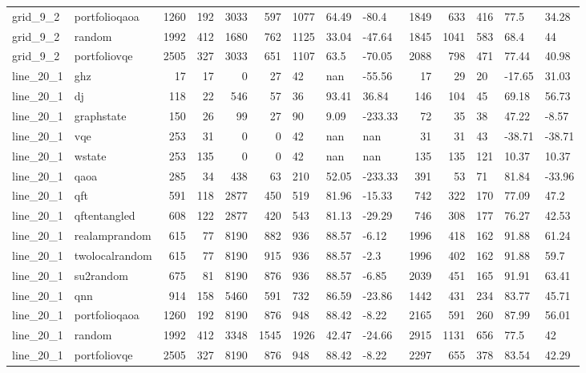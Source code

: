 \begin{longtable}{llrrrrlllrrlll}
grid\_9\_2 & portfolioqaoa & 1260 & 192 & 3033 & 597 & 1077 & 64.49 & -80.4 & 1849 & 633 & 416 & 77.5 & 34.28 \\
grid\_9\_2 & random & 1992 & 412 & 1680 & 762 & 1125 & 33.04 & -47.64 & 1845 & 1041 & 583 & 68.4 & 44 \\
grid\_9\_2 & portfoliovqe & 2505 & 327 & 3033 & 651 & 1107 & 63.5 & -70.05 & 2088 & 798 & 471 & 77.44 & 40.98 \\
line\_20\_1 & ghz & 17 & 17 & 0 & 27 & 42 & nan & -55.56 & 17 & 29 & 20 & -17.65 & 31.03 \\
line\_20\_1 & dj & 118 & 22 & 546 & 57 & 36 & 93.41 & 36.84 & 146 & 104 & 45 & 69.18 & 56.73 \\
line\_20\_1 & graphstate & 150 & 26 & 99 & 27 & 90 & 9.09 & -233.33 & 72 & 35 & 38 & 47.22 & -8.57 \\
line\_20\_1 & vqe & 253 & 31 & 0 & 0 & 42 & nan & nan & 31 & 31 & 43 & -38.71 & -38.71 \\
line\_20\_1 & wstate & 253 & 135 & 0 & 0 & 42 & nan & nan & 135 & 135 & 121 & 10.37 & 10.37 \\
line\_20\_1 & qaoa & 285 & 34 & 438 & 63 & 210 & 52.05 & -233.33 & 391 & 53 & 71 & 81.84 & -33.96 \\
line\_20\_1 & qft & 591 & 118 & 2877 & 450 & 519 & 81.96 & -15.33 & 742 & 322 & 170 & 77.09 & 47.2 \\
line\_20\_1 & qftentangled & 608 & 122 & 2877 & 420 & 543 & 81.13 & -29.29 & 746 & 308 & 177 & 76.27 & 42.53 \\
line\_20\_1 & realamprandom & 615 & 77 & 8190 & 882 & 936 & 88.57 & -6.12 & 1996 & 418 & 162 & 91.88 & 61.24 \\
line\_20\_1 & twolocalrandom & 615 & 77 & 8190 & 915 & 936 & 88.57 & -2.3 & 1996 & 402 & 162 & 91.88 & 59.7 \\
line\_20\_1 & su2random & 675 & 81 & 8190 & 876 & 936 & 88.57 & -6.85 & 2039 & 451 & 165 & 91.91 & 63.41 \\
line\_20\_1 & qnn & 914 & 158 & 5460 & 591 & 732 & 86.59 & -23.86 & 1442 & 431 & 234 & 83.77 & 45.71 \\
line\_20\_1 & portfolioqaoa & 1260 & 192 & 8190 & 876 & 948 & 88.42 & -8.22 & 2165 & 591 & 260 & 87.99 & 56.01 \\
line\_20\_1 & random & 1992 & 412 & 3348 & 1545 & 1926 & 42.47 & -24.66 & 2915 & 1131 & 656 & 77.5 & 42 \\
line\_20\_1 & portfoliovqe & 2505 & 327 & 8190 & 876 & 948 & 88.42 & -8.22 & 2297 & 655 & 378 & 83.54 & 42.29 \\

\end{longtable}
